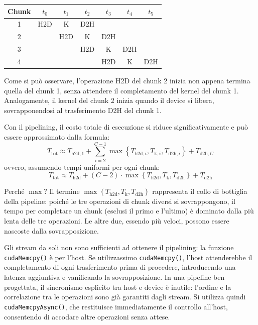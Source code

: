 \begin{center}
\begin{tabular}{|c|c|c|c|c|c|c|}
\hline
\textbf{Chunk} & \textbf{\(t_0\)} & \textbf{\(t_1\)} & \textbf{\(t_2\)} & \textbf{\(t_3\)} & \textbf{\(t_4\)} & \textbf{\(t_5\)} \\
\hline
1 & H2D & K & D2H & & & \\
\hline
2 & & H2D & K & D2H & & \\
\hline
3 & & & H2D & K & D2H & \\
\hline
4 & & & & H2D & K & D2H \\
\hline
\end{tabular}
\end{center}
Come si può osservare, l'operazione H2D del chunk 2 inizia non appena termina quella del chunk 1, senza attendere il completamento del kernel del chunk 1. Analogamente, il kernel del chunk 2 inizia quando il device si libera, sovrapponendosi al trasferimento D2H del chunk 1.

Con il pipelining, il costo totale di esecuzione si riduce significativamente e può essere approssimato dalla formula:
\[
T_{\mathrm{tot}} \approx T_{\mathrm{h2d},1} + \sum_{i=2}^{C-1} \max\left\{ T_{\mathrm{h2d},i}, T_{\mathrm{k},i}, T_{\mathrm{d2h},i} \right\} + T_{\mathrm{d2h},C}
\]
ovvero, assumendo tempi uniformi per ogni chunk:
\[
T_{\mathrm{tot}} \approx T_{\mathrm{h2d}} + (C-2) \cdot \max\left\{ T_{\mathrm{h2d}}, T_{\mathrm{k}}, T_{\mathrm{d2h}} \right\} + T_{\mathrm{d2h}}
\]

\begin{note}{Perché \(\max\)?}
    Il termine \(\max\left\{ T_{\mathrm{h2d}}, T_{\mathrm{k}}, T_{\mathrm{d2h}} \right\}\) rappresenta il collo di bottiglia della pipeline: poiché le tre operazioni di chunk diversi si sovrappongono, il tempo per completare un chunk (esclusi il primo e l'ultimo) è dominato dalla più lenta delle tre operazioni. Le altre due, essendo più veloci, possono essere nascoste dalla sovrapposizione.
\end{note}

\noindent
Gli stream da soli non sono sufficienti ad ottenere il pipelining: la funzione \texttt{cudaMemcpy()} è  per l'host. Se utilizzassimo \texttt{cudaMemcpy()}, l'host attenderebbe il completamento di ogni trasferimento prima di procedere, introducendo una latenza aggiuntiva e vanificando la sovrapposizione. 
In una pipeline ben progettata, il sincronismo esplicito tra host e device è inutile: l'ordine e la correlazione tra le operazioni sono già garantiti dagli stream. 
Si utilizza quindi \texttt{cudaMemcpyAsync()}, che restituisce immediatamente il controllo all'host, consentendo di accodare altre operazioni senza attese.

